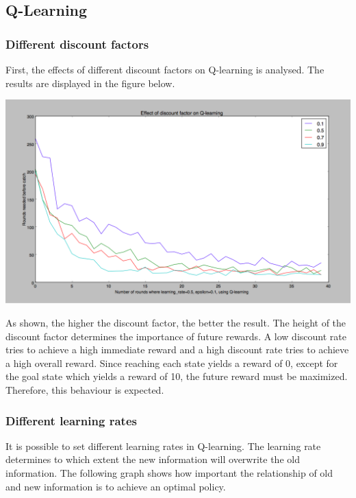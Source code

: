 \documentclass{article}
\begin{document}
\subsection{Q-Learning}

\subsubsection{Different discount factors}
First, the effects of different discount factors on Q-learning is analysed. The results are displayed in the figure below.

\begin{center}
	\includegraphics[scale=0.2]{discount_factors}
\end{center}

As shown, the higher the discount factor, the better the result. The height of the discount factor determines the importance of future rewards. A low discount rate tries to achieve a high immediate reward and a high discount rate tries to achieve a high overall reward. Since reaching each state yields a reward of 0, except for the goal state which yields a reward of 10, the future reward must be maximized. Therefore, this behaviour is expected. 

\subsubsection{Different learning rates}
It is possible to set different learning rates in Q-learning. The learning rate determines to which extent the new information will overwrite the old information. The following graph shows how important the relationship of old and new information is to achieve an optimal policy.
\end{document}
